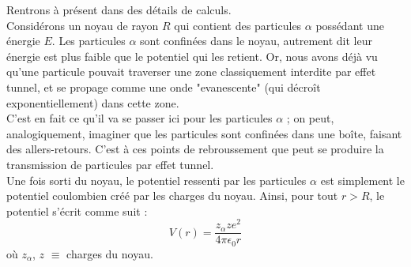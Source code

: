 Rentrons à présent dans des détails de calculs. \\
Considérons un noyau de rayon $R$ qui contient des particules $\alpha$ possédant une énergie $E$. 
Les particules $\alpha$ sont confinées dans le noyau, autrement dit leur énergie est plus faible que le potentiel qui les retient.
Or, nous avons déjà vu qu'une particule pouvait traverser une zone classiquement interdite par effet tunnel, et se propage comme une onde "evanescente" (qui décroît exponentiellement) dans cette zone. \\
C'est en fait ce qu'il va se passer ici pour les particules $\alpha$ ; on peut, analogiquement, imaginer que les particules sont confinées dans une boîte, faisant des allers-retours. C'est à ces points de rebroussement que peut se produire la transmission de particules par effet tunnel. \\

Une fois sorti du noyau, le potentiel ressenti par les particules $\alpha$ est simplement le potentiel coulombien créé par les charges du noyau. Ainsi, pour tout $r > R$, le potentiel s'écrit comme suit :
\begin{equation}
  V(r) = \frac{z_{\alpha} z e^2}{4 \pi \epsilon_0 r} %
\end{equation}
où $z_{\alpha}$, $z$ $\equiv$ charges du noyau. \\

